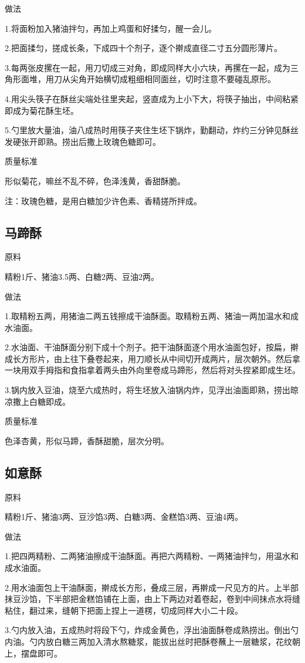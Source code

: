 \documentclass{ctexbook}
\begin{document}
做法

1.将面粉加入猪油拌匀，再加上鸡蛋和好揉匀，醒一会儿。

2.把面揉匀，搓成长条，下成四十个剂子，逐个擀成直径二寸五分圆形薄片。

3.每两张皮摞在一起，用刀切成三对角，即成同样大小六块，再摞在一起，成为三角形面堆，用刀从尖角开始横切成粗细相同面丝，切时注意不要碰乱原形。

4.用尖头筷子在酥丝尖端处往里夹起，竖直成为上小下大，将筷子抽出，中间粘紧即成为菊花酥生坯。

5.勺里放大量油，油八成热时用筷子夹住生坯下锅炸，勤翻动，炸约三分钟见酥丝发硬张开即熟。捞出后撒上玫瑰色糖即可。

质量标准

形似菊花，嘛丝不乱不碎，色泽浅黄，香甜酥脆。

注：玫瑰色糖，是用白糖加少许色素、香精搓所拌成。
\subsection{马蹄酥}
原料

精粉1斤、猪油3.5两、白糖2两、豆油2两。

做法

1.取精粉五两，用猪油二两五钱擦成干油酥面。取精粉五两、猪油一两加温水和成水油面。

2.水油面、干油酥面分别下成十个剂子。把干油酥面逐个用水油面包好，按扁，擀成长方形片，由上往下叠卷起来，用刀顺长从中间切开成两片，层次朝外。然后拿一块用双手拇指和食指拿着两头由外向里卷成马蹄形，然后将对头捏紧即成生坯。

3.锅内放入豆油，烧至六成热时，将生坯放入油锅内炸，见浮出油面即熟，捞出晾凉撒上白糖即成。

质量标准

色泽杏黄，形似马蹄，香酥甜脆，层次分明。
\subsection{如意酥}
原料

精粉1斤、猪油3两、豆沙馅3两、白糖3两、金糕馅3两、豆油4两。

做法

1.把四两精粉、二两猪油擦成干油酥面。再把六两精粉、一两猪油拌匀，用温水和成水油面。

2.用水油面包上干油酥面，擀成长方形，叠成三层，再擀成一尺见方的片。上半部抹豆沙馅，下半部把金糕馅铺在上面，由上下两边对着卷起，卷到中间抹点水将缝粘住，翻过来，缝朝下把面上捏上一道楞，切成同样大小二十段。

3.勺内放入油，五成热时将段下勺，炸成金黄色，浮出油面酥卷成熟捞出。倒出勺内油。勺内放白糖三两加入清水熬糖浆，能拔出丝时把酥卷蘸上一层糖浆，花纹朝上，摆盘即可。
\end{document}
